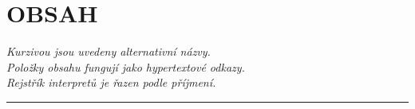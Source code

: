 \hypersetup{
linkcolor=black
}
\section*{\Huge OBSAH}
\large
\noindent\textit{Kurzivou jsou uvedeny alternativní názvy.\\
Položky obsahu fungují jako hypertextové odkazy.\\
Rejstřík interpretů je řazen podle příjmení.}
\vspace{-5pt}
\begin{center}
\begin{Large}
\hfill {}\hfill {}\hfill {}\hfill {}\hfill {}\hfill {}\hfill {}\hfill {}\hfill {}\hfill {}\hfill {}\hfill {}\hfill {}\hfill {}\hfill {}\hfill {}\hfill {}\hfill {}\hfill {}\hfill {}\hfill {}\hfill {}\hfill {}\hfill {}\hfill {}\hfill {}\hfill {}\hfill {}\hfill {}\hfill
\vspace{5pt}

\end{Large}

\rule{10cm}{0.03cm}
\end{center}


